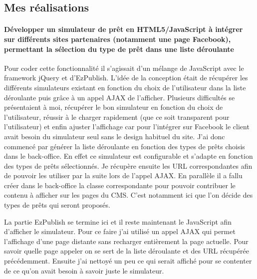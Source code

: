 \documentclass[a4paper,11pt,twoside]{report}
\begin{document}
    \subsection*{Mes réalisations}
      \paragraph*{Développer un simulateur de prêt en HTML5/JavaScript à intégrer sur différents sites partenaires (notamment une page Facebook), permettant la sélection du type de prêt dans une liste déroulante}
      Pour coder cette fonctionnalité il s'agissait d'un mélange de JavaScript avec le framework jQuery et d'EzPublish. L'idée de la conception était de récupérer les différents simulateurs existant en fonction du choix de l'utilisateur dans la liste déroulante puis grâce à un appel AJAX de l'afficher. Plusieurs difficultés se présentaient à moi, récupérer le bon simulateur en fonction du choix de l'utilisateur, réussir à le charger rapidement (que ce soit transparent pour l'utilisateur) et enfin ajuster l'affichage car pour l'intégrer sur Facebook le client avait besoin du simulateur seul sans le design habituel du site. J'ai donc commencé par générer la liste déroulante en fonction des types de prêts choisis dans le back-office. En effet ce simulateur est configurable et s'adapte en fonction des types de prêts sélectionnés. Je récupère ensuite les URL correspondantes afin de pouvoir les utiliser par la suite lors de l'appel AJAX. En parallèle il a fallu créer dans le back-office la classe correspondante pour pouvoir contribuer le contenu à afficher sur les pages du CMS. C'est notamment ici que l'on décide des types de prêts qui seront proposés.
      \label{global_loan_simulator_1}
      
      La partie EzPublish se termine ici et il reste maintenant le JavaScript afin d'afficher le simulateur. Pour ce faire j'ai utilisé un appel AJAX qui permet l'affichage d'une page distante sans recharger entièrement la page actuelle. Pour savoir quelle page appeler on se sert de la liste déroulante et des URL récupérée précédemment. Ensuite j'ai nettoyé un peu ce qui serait affiché pour se contenter de ce qu'on avait besoin à savoir juste le simulateur.
      \label{global_loan_simulator_2}
\end{document}
